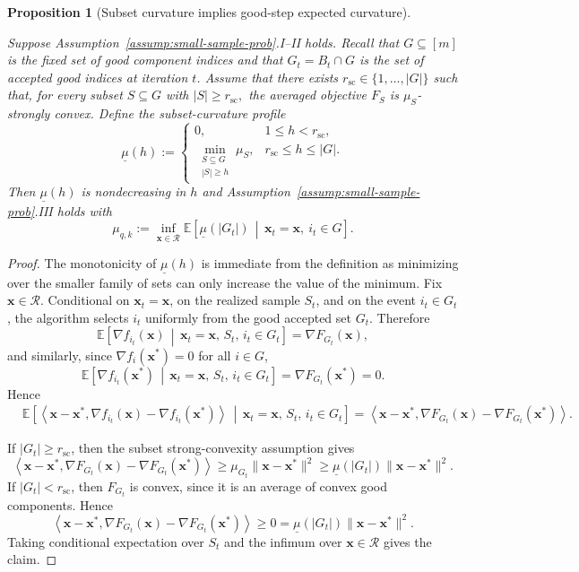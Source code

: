 \documentclass[11pt]{article}
\newcommand{\ve}[1]{\mathbf{#1}}
\newtheorem{prop}{Proposition}
\begin{document}
\begin{prop}[Subset curvature implies good-step expected curvature]
\label{prop:subset-curvature-small-sample}

Suppose Assumption~\ref{assump:small-sample-prob}.I--II holds. Recall that
\(G\subseteq[m]\) is the fixed set of good component indices and that
\(G_t=B_t\cap G\) is the set of accepted good indices at iteration \(t\). Assume that there exists
$r_{\mathrm{sc}}\in\{1,\ldots,|G|\}$
such that, for every subset \(S\subseteq G\) with
$|S|\ge r_{\mathrm{sc}},$
the averaged objective \(F_S\) is \(\mu_S\)-strongly convex. Define the
subset-curvature profile
\[
\underline{\mu}(h)
:=
\begin{cases}
0,
& 1\le h<r_{\mathrm{sc}},\\[2mm]
\displaystyle
\min_{\substack{S\subseteq G\\ |S|\ge h}}\mu_S,
& r_{\mathrm{sc}}\le h\le |G|.
\end{cases}
\]
Then \(\underline{\mu}(h)\) is nondecreasing in \(h\) and Assumption~\ref{assump:small-sample-prob}.III holds with
\[
\mu_{q,k}
:=
\inf_{\ve{x}\in\mathcal R}
\mathbb{E}\!\left[
\underline{\mu}(|G_t|)
\,\middle|\,
\ve{x}_t=\ve{x},\ i_t\in G
\right].
\]
\end{prop}
\begin{proof}
The monotonicity of \(\underline{\mu}(h)\) is immediate from the definition as minimizing over the smaller family of sets can only increase the value of the minimum. Fix \(\ve{x}\in\mathcal R\). Conditional on \(\ve{x}_t=\ve{x}\), on the
realized sample \(S_t\), and on the event \(i_t\in G_t\), the algorithm selects
\(i_t\) uniformly from the good accepted set \(G_t\). Therefore
\[
\mathbb{E}\!\left[
\nabla f_{i_t}(\ve{x})
\,\middle|\,
\ve{x}_t=\ve{x},\,S_t,\,i_t\in G_t
\right]
=
\nabla F_{G_t}(\ve{x}),
\]
and similarly, since \(\nabla f_i(\ve{x}^*)=0\) for all \(i\in G\),
\[
\mathbb{E}\!\left[
\nabla f_{i_t}(\ve{x}^*)
\,\middle|\,
\ve{x}_t=\ve{x},\,S_t,\,i_t\in G_t
\right]
=
\nabla F_{G_t}(\ve{x}^*)
=
0.
\]
Hence
\begin{align*}
&\mathbb{E}\!\left[
\left\langle
\ve{x}-\ve{x}^*,
\nabla f_{i_t}(\ve{x})-\nabla f_{i_t}(\ve{x}^*)
\right\rangle
\,\middle|\,
\ve{x}_t=\ve{x},\,S_t,\,i_t\in G_t
\right] =
\left\langle
\ve{x}-\ve{x}^*,
\nabla F_{G_t}(\ve{x})-\nabla F_{G_t}(\ve{x}^*)
\right\rangle.
\end{align*}

If \(|G_t|\ge r_{\mathrm{sc}}\), then the subset strong-convexity
assumption gives
\[
\left\langle
\ve{x}-\ve{x}^*,
\nabla F_{G_t}(\ve{x})-\nabla F_{G_t}(\ve{x}^*)
\right\rangle
\ge
\mu_{G_t}\|\ve{x}-\ve{x}^*\|^2
\ge
\underline{\mu}(|G_t|)\|\ve{x}-\ve{x}^*\|^2.
\]
If \(|G_t|<r_{\mathrm{sc}}\), then \(F_{G_t}\) is convex, since it is
an average of convex good components. Hence
\[
\left\langle
\ve{x}-\ve{x}^*,
\nabla F_{G_t}(\ve{x})-\nabla F_{G_t}(\ve{x}^*)
\right\rangle
\ge 0
=
\underline{\mu}(|G_t|)\|\ve{x}-\ve{x}^*\|^2.
\]
Taking conditional expectation over \(S_t\) and the infimum over
\(\ve{x}\in\mathcal R\) gives the claim.
\end{proof}
\end{document}
